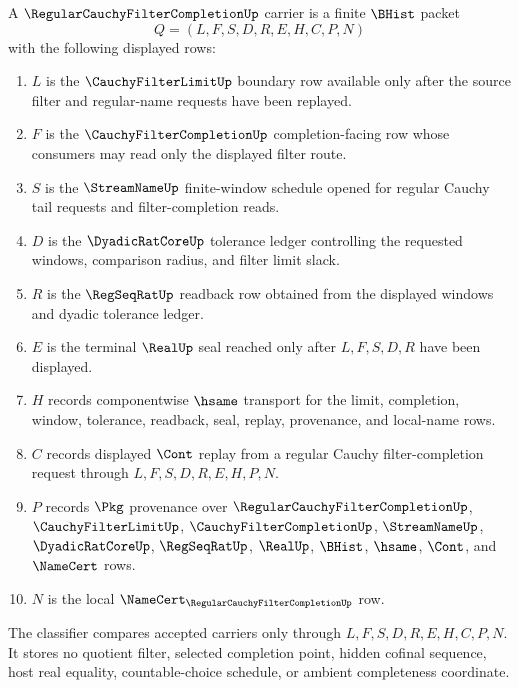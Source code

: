 \begin{definition}
\label{def:regular-cauchy-filter-completion-carrier}
A $\RegularCauchyFilterCompletionUp$ carrier is a finite $\BHist$ packet
$$
Q=(L,F,S,D,R,E,H,C,P,N)
$$
with the following displayed rows:
\begin{enumerate}
\item $L$ is the $\CauchyFilterLimitUp$ boundary row available only after the source filter and regular-name requests have been replayed.
\item $F$ is the $\CauchyFilterCompletionUp$ completion-facing row whose consumers may read only the displayed filter route.
\item $S$ is the $\StreamNameUp$ finite-window schedule opened for regular Cauchy tail requests and filter-completion reads.
\item $D$ is the $\DyadicRatCoreUp$ tolerance ledger controlling the requested windows, comparison radius, and filter limit slack.
\item $R$ is the $\RegSeqRatUp$ readback row obtained from the displayed windows and dyadic tolerance ledger.
\item $E$ is the terminal $\RealUp$ seal reached only after $L,F,S,D,R$ have been displayed.
\item $H$ records componentwise $\hsame$ transport for the limit, completion, window, tolerance, readback, seal, replay, provenance, and local-name rows.
\item $C$ records displayed $\Cont$ replay from a regular Cauchy filter-completion request through $L,F,S,D,R,E,H,P,N$.
\item $P$ records $\Pkg$ provenance over $\RegularCauchyFilterCompletionUp$, $\CauchyFilterLimitUp$, $\CauchyFilterCompletionUp$, $\StreamNameUp$, $\DyadicRatCoreUp$, $\RegSeqRatUp$, $\RealUp$, $\BHist$, $\hsame$, $\Cont$, and $\NameCert$ rows.
\item $N$ is the local $\NameCert_{\RegularCauchyFilterCompletionUp}$ row.
\end{enumerate}
The classifier compares accepted carriers only through $L,F,S,D,R,E,H,C,P,N$. It stores no quotient filter, selected completion point, hidden cofinal sequence, host real equality, countable-choice schedule, or ambient completeness coordinate.
\end{definition}

